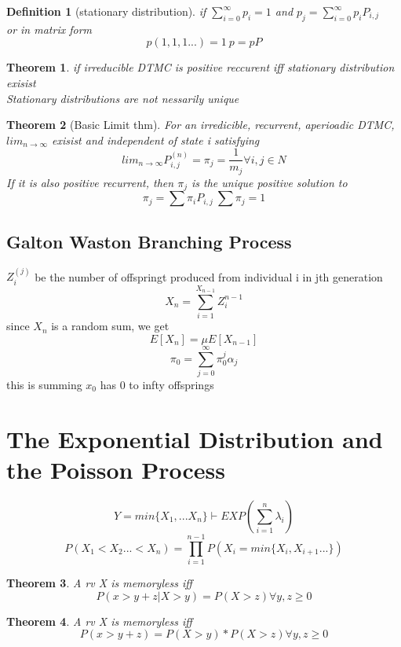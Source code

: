 \documentclass[10pt]{article}
\theoremstyle{break}
\newtheorem{thm}{Theorem}[subsection]
\newtheorem{defn}{Definition}[subsection]
\begin{document}
            \begin{defn}[stationary distribution]
                if $\sum^\infty_{i=0}p_i=1$ and $p_j=\sum_{i=0}^\infty p_iP_{i,j}$\\
                or in matrix form $$p(1,1,1...)=1\ p=pP$$
            \end{defn}
            \begin{thm}
                if irreducible DTMC is positive reccurent iff stationary distribution exisist
                \\Stationary distributions are not nessarily unique
            \end{thm}
            \begin{thm}[Basic Limit thm]
                For an irredicible, recurrent, aperioadic DTMC, $lim_{n\rightarrow \infty}$ exisist and independent of state i satisfying
                $$lim_{n\rightarrow\infty}P_{i,j}^{(n)}=\pi_j=\frac{1}{m_j} \forall i,j\in N$$
                If it is also positive recurrent, then $\pi_j$ is the unique positive solution to 
                $$\pi_j=\sum \pi_i P_{i,j}\ \sum \pi_j=1$$
                
            \end{thm}
        \subsection{Galton Waston Branching Process}
            $Z_i^{(j)}$ be the number of offspringt produced from individual i in jth generation
            $$X_n=\sum_{i=1}^{X_{n-1}}Z_i^{n-1}$$
            since $X_n$ is a random sum, we get 
            $$E[X_n]=\mu E[X_{n-1}]$$
            $$\pi_0=\sum_{j=0}^\infty \pi_0^j\alpha_j$$
            this is summing $x_0$ has 0 to infty offsprings
                
    \section{The Exponential Distribution and the Poisson Process}
        
    $$Y=min\{X_1, ... X_n\} \vdash EXP(\sum_{i=1}^n\lambda_i)$$
    $$P(X_1<X_2...<X_n)=\prod_{i=1}^{n-1}P(X_i=min\{X_i, X_{i+1}...\})$$
    \begin{thm}
        A rv X is memoryless iff $$P(x>y+z|X>y)=P(X>z)\forall y,z\geq 0$$
    \end{thm}

    \begin{thm}
        A rv X is memoryless iff $$P(x>y+z)=P(X>y)*P(X>z)\forall y,z\geq 0$$
    \end{thm}
\end{document}
